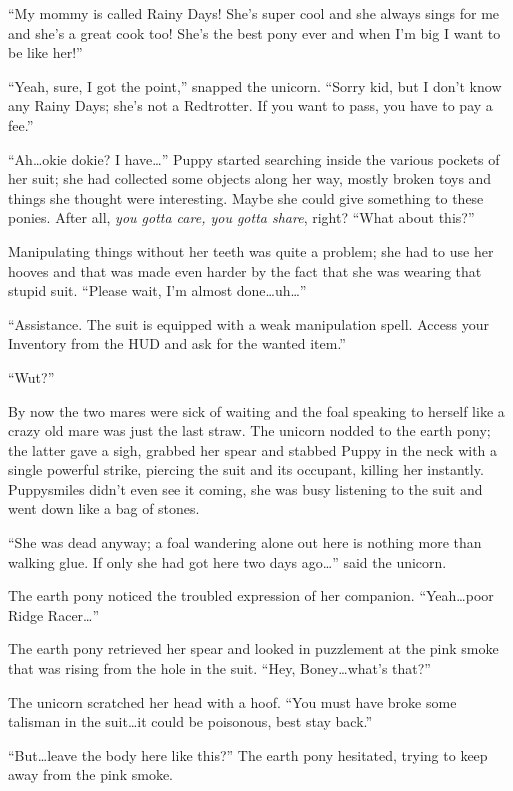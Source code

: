 ``My mommy is called Rainy Days! She's super cool and she always sings for me and she's a great cook too! She's the best pony ever and when I'm big I want to be like her!''

``Yeah, sure, I got the point,'' snapped the unicorn. ``Sorry kid, but I don't know any Rainy Days; she's not a Redtrotter. If you want to pass, you have to pay a fee.''

``Ah\dots okie dokie? I have\dots'' Puppy started searching inside the various pockets of her suit; she had collected some objects along her way, mostly broken toys and things she thought were interesting. Maybe she could give something to these ponies. After all, \emph{you gotta care, you gotta share}, right? ``What about this?''

Manipulating things without her teeth was quite a problem; she had to use her hooves and that was made even harder by the fact that she was wearing that stupid suit. ``Please wait, I'm almost done\dots uh\dots''

``{\mt Assistance. The suit is equipped with a weak manipulation spell. Access your Inventory from the HUD and ask for the wanted item.}''

``Wut?''

By now the two mares were sick of waiting and the foal speaking to herself like a crazy old mare was just the last straw. The unicorn nodded to the earth pony; the latter gave a sigh, grabbed her spear and stabbed Puppy in the neck with a single powerful strike, piercing the suit and its occupant, killing her instantly. Puppysmiles didn't even see it coming, she was busy listening to the suit and went down like a bag of stones.

``She was dead anyway; a foal wandering alone out here is nothing more than walking glue. If only she had got here two days ago\dots'' said the unicorn.

The earth pony noticed the troubled expression of her companion. ``Yeah\dots poor Ridge Racer\dots''

The earth pony retrieved her spear and looked in puzzlement at the pink smoke that was rising from the hole in the suit. ``Hey, Boney\dots what's that?''

The unicorn scratched her head with a hoof. ``You must have broke some talisman in the suit\dots it could be poisonous, best stay back.''

``But\dots leave the body here like this?'' The earth pony hesitated, trying to keep away from the pink smoke.

